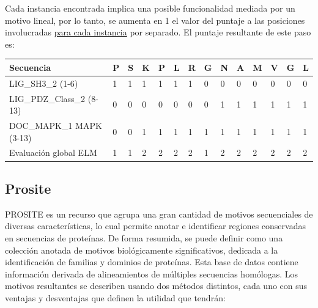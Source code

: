 Cada instancia encontrada implica una posible funcionalidad mediada por un motivo lineal, por lo tanto, se aumenta en 1 el valor del puntaje a las posiciones involucradas \underline{para cada instancia} por separado.
El puntaje resultante de este paso es:


\begin{tabular}{llllllllllllll} 
\hline
Secuencia & \textbf{P} & \textbf{S} & \textbf{K} & \textbf{P} & \textbf{L} & \textbf{R} & \textbf{G} & \textbf{N} & \textbf{A} & \textbf{M} & \textbf{V} & \textbf{G} & \textbf{L} \\ \hline
LIG\_SH3\_2 (1-6) & 1 & 1 & 1 & 1 & 1 & 1 & 0 & 0 & 0 & 0 & 0 & 0 & 0\\ \hline
LIG\_PDZ\_Class\_2 (8-13) & 0 & 0 & 0 & 0 & 0 & 0 & 0 & 1 & 1 & 1 & 1 & 1 & 1 \\ \hline
DOC\_MAPK\_1 MAPK (3-13)  & 0 & 0 & 1 & 1 & 1 & 1 & 1 & 1 & 1 & 1 & 1 & 1 & 1 \\ \hline
Evaluación global ELM & 1 & 1 & 2 & 2 & 2 & 2 & 1 & 2 & 2 & 2 & 2 & 2 & 2\\ \hline
\end{tabular}



\subsection{Prosite}

PROSITE\cite{sigrist2002prosite,prositeWeb} es un recurso que agrupa una gran cantidad de motivos secuenciales de diversas características,
lo cual permite anotar e identificar regiones conservadas en secuencias de proteínas.
De forma resumida, se puede definir como una colección anotada de motivos biológicamente significativos, dedicada a la identificación de familias y dominios de proteínas.
Esta base de datos contiene información derivada de alineamientos de múltiples secuencias homólogas. 
Los motivos resultantes se describen usando dos métodos distintos, cada uno con sus ventajas y desventajas que definen la utilidad que tendrán:

